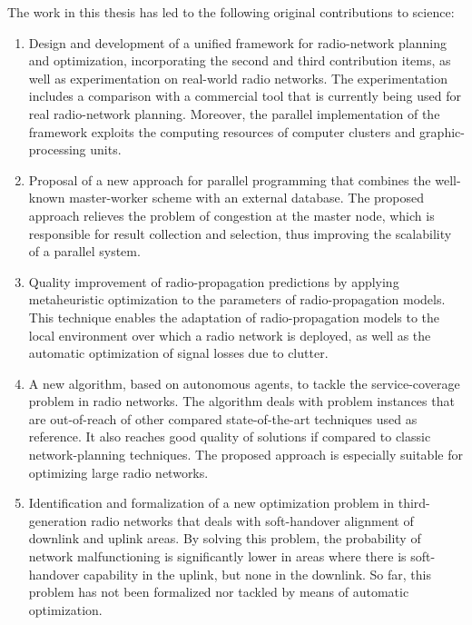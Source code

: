 The work in this thesis has led to the following original contributions
to science:
\begin{enumerate}
\item Design and development of a unified framework for radio-network planning
and optimization, incorporating the second and third contribution
items, as well as experimentation on real-world radio networks. The
experimentation includes a comparison with a commercial tool that
is currently being used for real radio-network planning. Moreover,
the parallel implementation of the framework exploits the computing
resources of computer clusters and graphic-processing units.
\item Proposal of a new approach for parallel programming that combines
the well-known master-worker scheme with an external database. The
proposed approach relieves the problem of congestion at the master
node, which is responsible for result collection and selection, thus
improving the scalability of a parallel system.
\item Quality improvement of radio-propagation predictions by applying metaheuristic
optimization to the parameters of radio-propagation models. This technique
enables the adaptation of radio-propagation models to the local environment
over which a radio network is deployed, as well as the automatic optimization
of signal losses due to clutter.
\item A new algorithm, based on autonomous agents, to tackle the service-coverage
problem in radio networks. The algorithm deals with problem instances
that are out-of-reach of other compared state-of-the-art techniques
used as reference. It also reaches good quality of solutions if compared
to classic network-planning techniques. The proposed approach is especially
suitable for optimizing large radio networks.
\item Identification and formalization of a new optimization problem in
third-generation radio networks that deals with soft-handover alignment
of downlink and uplink areas. By solving this problem, the probability
of network malfunctioning is significantly lower in areas where there
is soft-handover capability in the uplink, but none in the downlink.
So far, this problem has not been formalized nor tackled by means
of automatic optimization.\end{enumerate}

